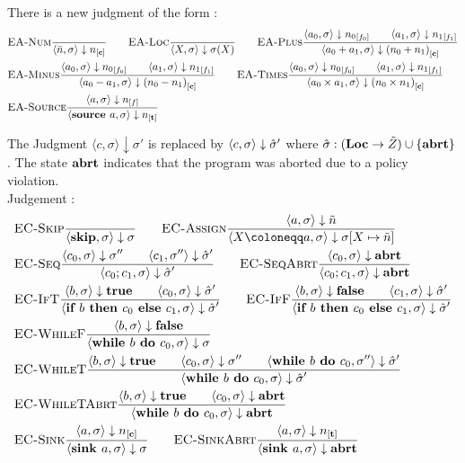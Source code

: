There is a new judgment of the form 
:
\begin{align*}
    &\bsrule{EA-Num}{}{\bigstep{\literalint}{\store}{\clean}} \qquad
    \bsrule{EA-Loc}{}{\bigstep{X}{\store}{\store(X)}}\qquad
    \bsrule{EA-Plus}
    {\bigstep{a_0}{\store}{\flagged[n_0][0]}
    \qquad \bigstep{a_1}{\store}{\flagged[n_1][1]}}
    {\bigstep{a_0+a_1}{\store}{\clean[(n_0+n_1)]}}\\
    &\bsrule{EA-Minus}
    {\bigstep{a_0}{\store}{\flagged[n_0][0]}
    \qquad \bigstep{a_1}{\store}{\flagged[n_1][1]}}
    {\bigstep{a_0-a_1}{\store}{\clean[(n_0-n_1)]}} \qquad
    \bsrule{EA-Times}
    {\bigstep{a_0}{\store}{\flagged[n_0][0]}
    \qquad \bigstep{a_1}{\store}{\flagged[n_1][1]}}
    {\bigstep{a_0 \times a_1}{\store}{\clean[(n_0 \times n_1)]}}\\
    &\bsrule{EA-Source}{\bigstep{a}{\store}{\flagged}}
    {\bigstep{\source{a}}{\store}{\tracked}}
\end{align*}

The Judgment $\langle c, \sigma \rangle \downarrow \sigma'$ is replaced by 
$\langle c, \sigma \rangle \downarrow \hat{\sigma}'$
where $\hat{\sigma}{}: (\textbf{Loc} \to \tilde{Z}) \cup \{\textbf{abrt}\}$.
The state $\textbf{abrt}$ indicates that the program was aborted due to a policy violation.
\\
Judgement :
\begin{align*}
    &\bsrule{EC-Skip}{}{\bigstep{\skipcmd}{\store}{\store}}\qquad
    \bsrule{EC-Assign}{\bigstep{a}{\store}{\flaggedn{}}}
    {\bigstep{\defaultstore}{\store}{\store{}[X \mapsto \flaggedn{}]}}\\
    &\bsrule{EC-Seq}{\bigstep{c_0}{\sigma}{\store''} \qquad \bigstep{c_1}{\store''}{\excstore'}}
    {\bigstep{\defaultseq}{\store}{\excstore'}}\qquad
    \bsrule{EC-SeqAbrt}{\bigstep{c_0}{\sigma}{\exception}}
    {\bigstep{\defaultseq}{\store}{\exception}} \\
    &\bsrule{EC-IfT}{\bigstep{b}{\store}{\btrue}\qquad \bigstep{c_0}{\store}{\excstore'}}
    {\bigstep{\defaultif}{\store}{\excstore'}} \qquad
    \bsrule{EC-IfF}{\bigstep{b}{\store}{\bfalse}\qquad \bigstep{c_1}{\store}{\excstore'}}
    {\bigstep{\defaultif}{\store}{\excstore'}}\\
    &\bsrule{EC-WhileF}{\bigstep{b}{\sigma}{\bfalse}}
    {\bigstep{\defaultwhile}{\store}{\store}} \\
    &\bsrule{EC-WhileT}{\bigstep{b}{\sigma}{\btrue} \qquad \bigstep{c_0}{\store}{\store''}\qquad
    \bigstep{\defaultwhile}{\store''}{\excstore'}}
    {\bigstep{\defaultwhile}{\store}{\excstore'}}\\
    &\bsrule{EC-WhileTAbrt}{\bigstep{b}{\sigma}{\btrue} \qquad \bigstep{c_0}{\store}{\exception}}
    {\bigstep{\defaultwhile}{\store}{\exception}}\\
    &\bsrule{EC-Sink}{\bigstep{a}{\store}{\clean{}}}
    {\bigstep{\defaultsink}{\store}{\store}} \qquad
    \bsrule{EC-SinkAbrt}{\bigstep{a}{\store}{\tracked{}}}
    {\bigstep{\defaultsink}{\store}{\exception}}\\
\end{align*}


